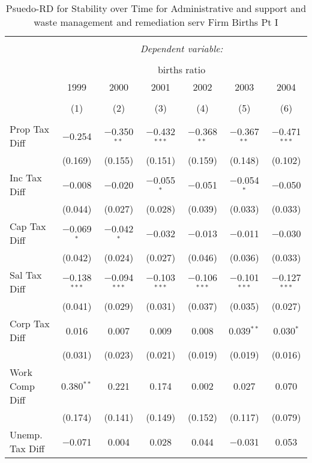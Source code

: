
\begin{table}[!htbp] \centering 
  \caption{Psuedo-RD for Stability over Time for  Administrative and support and waste management and remediation serv Firm Births Pt I} 
  \label{56year} 
\small 
\begin{tabular}{@{\extracolsep{5pt}}lcccccc} 
\\[-1.8ex]\hline 
\hline \\[-1.8ex] 
 & \multicolumn{6}{c}{\textit{Dependent variable:}} \\ 
\cline{2-7} 
\\[-1.8ex] & \multicolumn{6}{c}{births ratio} \\ 
 & 1999 & 2000 & 2001 & 2002 & 2003 & 2004 \\ 
\\[-1.8ex] & (1) & (2) & (3) & (4) & (5) & (6)\\ 
\hline \\[-1.8ex] 
 Prop Tax Diff & $-$0.254 & $-$0.350$^{**}$ & $-$0.432$^{***}$ & $-$0.368$^{**}$ & $-$0.367$^{**}$ & $-$0.471$^{***}$ \\ 
  & (0.169) & (0.155) & (0.151) & (0.159) & (0.148) & (0.102) \\ 
  Inc Tax Diff & $-$0.008 & $-$0.020 & $-$0.055$^{*}$ & $-$0.051 & $-$0.054$^{*}$ & $-$0.050 \\ 
  & (0.044) & (0.027) & (0.028) & (0.039) & (0.033) & (0.033) \\ 
  Cap Tax Diff & $-$0.069$^{*}$ & $-$0.042$^{*}$ & $-$0.032 & $-$0.013 & $-$0.011 & $-$0.030 \\ 
  & (0.042) & (0.024) & (0.027) & (0.046) & (0.036) & (0.033) \\ 
  Sal Tax Diff & $-$0.138$^{***}$ & $-$0.094$^{***}$ & $-$0.103$^{***}$ & $-$0.106$^{***}$ & $-$0.101$^{***}$ & $-$0.127$^{***}$ \\ 
  & (0.041) & (0.029) & (0.031) & (0.037) & (0.035) & (0.027) \\ 
  Corp Tax Diff & 0.016 & 0.007 & 0.009 & 0.008 & 0.039$^{**}$ & 0.030$^{*}$ \\ 
  & (0.031) & (0.023) & (0.021) & (0.019) & (0.019) & (0.016) \\ 
  Work Comp Diff & 0.380$^{**}$ & 0.221 & 0.174 & 0.002 & 0.027 & 0.070 \\ 
  & (0.174) & (0.141) & (0.149) & (0.152) & (0.117) & (0.079) \\ 
  Unemp. Tax Diff & $-$0.071 & 0.004 & 0.028 & 0.044 & $-$0.031 & 0.053 \\ 

\end{tabular}
\end{table}
